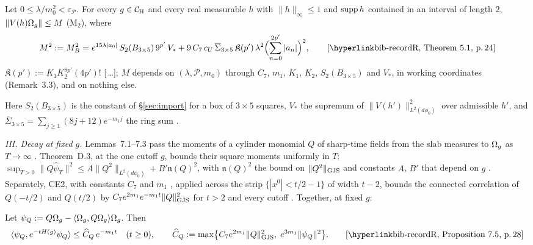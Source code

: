 \begin{checkpoint}
Let $0\le\lambda/m_0^2<\varepsilon_{\mathscr P}$. For every $g\in\mathcal{C}_{\mathrm H}$ and every real
measurable $h$ with $\|h\|_\infty\le1$ and $\operatorname{supp} h$ contained in an interval of length
$2$, $\|V(h)\Omega_g\|\le M$ (M$_2$), where
\begin{equation*}
 M^2:=M_B^2=e^{15\lambda|a_0|}\,S_2(B_{3\times5})\,9^{p'}\,V_*
 +9\,C_7\,c_U\,\overline\Sigma_{3\times5}\,\mathfrak K(p')\,\lambda^2
 \Bigl(\sum_{n=0}^{2p'}|a_n|\Bigr)^2,
 \tag*{\rec{Theorem~5.1}{24}}
\end{equation*}
$\mathfrak K(p'):=K_1K_2^{8p'}(4p')!$ [\,\dots]; $M$ depends on $(\lambda,\mathscr P,m_0)$ through $C_7$, $m_1$, $K_1$, $K_2$,
$S_2(B_{3\times5})$ and $V_*$, in working coordinates (Remark~3.3), and on nothing else.
\end{checkpoint}
Here $S_2(B_{3\times5})$ is the constant of \S\ref{sec:import} for a box of $3\times5$
squares, $V_*$ the supremum of $\|V(h')\|_{L^2(d\phi_0)}^2$ over admissible $h'$, and
$\overline\Sigma_{3\times5}=\sum_{j\ge1}(8j+12)e^{-m_1j}$ the ring sum
.

\emph{III. Decay at fixed $g$.} Lemmas~7.1--7.3 pass the moments of a cylinder monomial
$Q$ of sharp-time fields from the slab measures to $\Omega_g$ as $T\to\infty$
. Theorem~D.3, at the one cutoff $g$, bounds their square
moments uniformly in $T$:
$\sup_{T>0}\|Q\hat\psi_T\|^2\le A\|Q^2\|_{L^2(d\phi_0)}+B'\mathfrak n(Q)^2$, with
$\mathfrak n(Q)^2$ the bound  on $\|Q^2\|_{\rm GJS}$ and constants $A$, $B'$
that depend on $g$ . Separately, CE2, with constants $C_7$ and $m_1$
, applied across the strip $\{|x^0|<t/2-1\}$ of width $t-2$,
bounds the connected correlation of $Q(-t/2)$ and $Q(t/2)$ by
$C_7e^{2m_1}e^{-m_1t}\|Q\|_{\rm GJS}^2$ for $t>2$ and every cutoff .
Together, at fixed $g$:

\begin{checkpoint}
Let $\psi_Q:=Q\Omega_g-\langle \Omega_g,Q\Omega_g\rangle\Omega_g$. Then
\begin{equation*}
 \ip{\psi_Q}{e^{-tH(g)}\psi_Q}\le\widehat C_Q\,e^{-m_1t}\quad(t\ge0),
 \qquad
 \widehat C_Q:=\max\bigl\{C_7e^{2m_1}\|Q\|_{\rm GJS}^2,\;e^{3m_1}\|\psi_Q\|^2\bigr\} .
 \tag*{\rec{Proposition~7.5}{28}}
\end{equation*}
\end{checkpoint}

